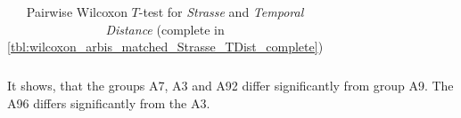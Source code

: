 \begin{table}[ht!]
\begin{tabular}{rrrrrrrrrrrrrrrrr}
		\bottomrule
	\end{tabular}
	\caption{Pairwise Wilcoxon $T$-test for \textit{Strasse} and \textit{Temporal Distance} (complete in \cref{tbl:wilcoxon_arbis_matched_Strasse_TDist_complete})}
	\label{tbl:wilcoxon_arbis_matched_Strasse_TDist}
\end{table}
It shows, that the groups A7, A3 and A92 differ significantly from group A9. The A96 differs significantly from the A3.
